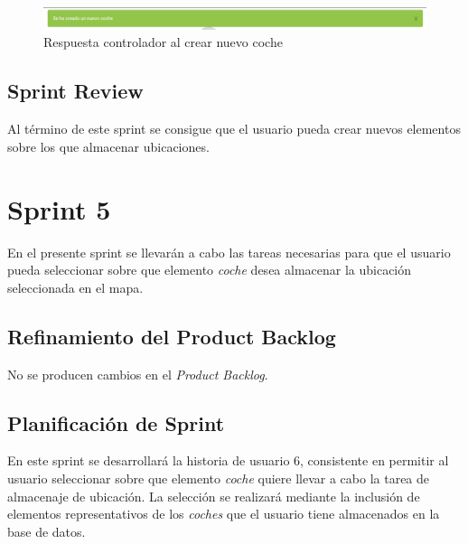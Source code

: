 	\begin{figure}[H]
		\centering
		\includegraphics[width=15cm, fbox={\fboxrule} 4mm]{images/05-resultados/18-crear_coche2.png}
		\caption{Respuesta controlador al crear nuevo coche}
		\label{fig:crear_coche2}
	\end{figure}
		
	\subsection{Sprint Review}
	Al término de este sprint se consigue que el usuario pueda crear nuevos elementos sobre los que almacenar ubicaciones.

\section{Sprint 5}
	En el presente sprint se llevarán a cabo las tareas necesarias para que el usuario pueda seleccionar sobre que elemento \textit{coche} desea almacenar la ubicación seleccionada en el mapa.
	\subsection{Refinamiento del Product Backlog}
	No se producen cambios en el \textit{Product Backlog}.
	
	\subsection{Planificación de Sprint}
	En este sprint se desarrollará la historia de usuario 6, consistente en permitir al usuario seleccionar sobre que elemento \textit{coche} quiere llevar a cabo la tarea de almacenaje de ubicación. La selección se realizará mediante la inclusión de elementos representativos de los \textit{coches} que el usuario tiene almacenados en la base de datos.
	
